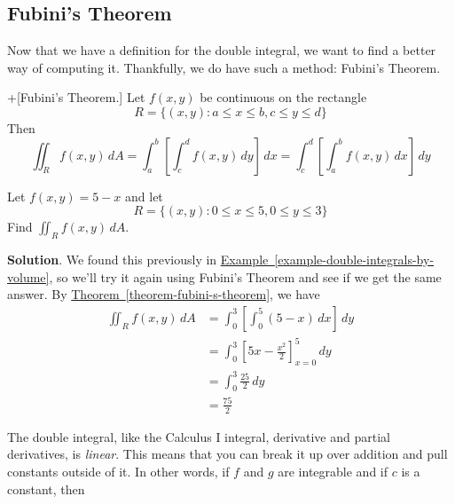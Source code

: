 \documentclass[10pt,]{book}
\theoremstyle{ptxplainnotitle}
\theoremstyle{ptxplaintitle}
\theoremstyle{ptxplainnotitle}
\theoremstyle{ptxplaintitle}
\theoremstyle{ptxplainnotitle}
\theoremstyle{ptxplaintitle}
\theoremstyle{ptxdefinitionnotitle}
\theoremstyle{ptxdefinitiontitle}
\theoremstyle{ptxdefinitionnotitle}
\theoremstyle{ptxdefinitiontitle}
\theoremstyle{ptxdefinitionnotitle}
\theoremstyle{ptxdefinitiontitle}
\theoremstyle{ptxdefinitionnotitle}
\theoremstyle{ptxdefinitiontitle}
\theoremstyle{ptxdefinitionnotitle}
\theoremstyle{ptxdefinitiontitle}
\numberwithin{equation}{section}
\begin{document}
\subsection[{Fubini's Theorem}]{Fubini's Theorem}\label{subsection-fubini-s-theorem}
\hypertarget{p-1120}{}%
Now that we have a definition for the double integral, we want to find a better way of computing it. Thankfully, we do have such a method: Fubini's Theorem.%
\begin{theorem}+[{Fubini's Theorem.}]\label{theorem-fubini-s-theorem}
\hypertarget{p-1121}{}%
Let \(f(x,y)\) be continuous on the rectangle%
\begin{equation*}
R = \{(x,y) : a\leq x\leq b, c\leq y\leq d\}
\end{equation*}
Then%
\begin{equation*}
\iint_{R}f(x,y)\,dA = \int_{a}^{b}\left[\int_{c}^{d}f(x,y)\,dy\right]\,dx = \int_{c}^{d}\left[\int_{a}^{b}f(x,y)\,dx\right]\,dy
\end{equation*}
%
\end{theorem}
\begin{example}\label{example-double-integrals-by-fubini-s-theorem}
\hypertarget{p-1122}{}%
Let \(f(x,y) = 5 - x\) and let%
\begin{equation*}
R = \{(x,y) : 0\leq x\leq 5, 0\leq y\leq 3\}
\end{equation*}
Find \(\iint_{R}f(x,y)\,dA\).%
\par\smallskip%
\noindent\textbf{Solution}.\hypertarget{solution-177}{}\quad%
\hypertarget{p-1123}{}%
We found this previously in \hyperref[example-double-integrals-by-volume]{Example~\ref{example-double-integrals-by-volume}}, so we'll try it again using Fubini's Theorem and see if we get the same answer. By \hyperref[theorem-fubini-s-theorem]{Theorem~\ref{theorem-fubini-s-theorem}}, we have%
\begin{align*}
\iint_{R}f(x,y)\,dA & = \int_{0}^{3}\left[\int_{0}^{5}(5-x)\,dx\right]\,dy \\
& = \int_{0}^{3}\left[5x - \frac{x^{2}}{2}\right]_{x=0}^{5}\,dy \\
& = \int_{0}^{3}\frac{25}{2}\,dy \\
& = \frac{75}{2} 
\end{align*}
%
\end{example}
\hypertarget{p-1124}{}%
The double integral, like the Calculus I integral, derivative and partial derivatives, is \emph{linear}. This means that you can break it up over addition and pull constants outside of it. In other words, if \(f\) and \(g\) are integrable and if \(c\) is a constant, then%
\end{document}
